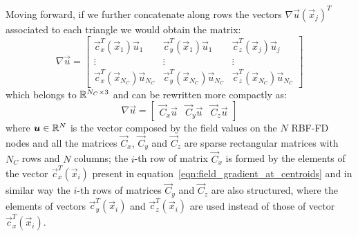 Moving forward, if we further concatenate along rows the vectors $\nabla \vec{u}(\vec{x}_j)^T$ associated to each triangle we would obtain the matrix:
\begin{equation}
	\label{eqn:field_gradient_at_centroids}
		\nabla \vec{u} =
			\begin{bmatrix}
				\vec{c}_x^T(\vec{x}_1) \vec{u}_1  			  &  \vec{c}_y^T(\vec{x}_1) \vec{u}_1  		   &  \vec{c}_z^T(\vec{x}_j) \vec{u}_j  							\\
				\vdots									  & \vdots					   		 		   & \vdots															\\
				\vec{c}_x^T(\vec{x}_{N_C}) \vec{u}_{N_C}  &  \vec{c}_y^T(\vec{x}_{N_C}) \vec{u}_{N_C}  &  \vec{c}_z^T(\vec{x}_{N_C}) \vec{u}_{N_C}
			\end{bmatrix}
\end{equation}
which belongs to $\mathbb{R}^{N_C \times 3}$ and can be rewritten more compactly as:
\begin{equation}
	\nabla \vec{u} =
	\begin{bmatrix}
		\vec{C}_x \vec{u}  &  \vec{C}_y \vec{u}  &  \vec{C}_z \vec{u}
	\end{bmatrix}
\end{equation}
where $\boldsymbol{u} \in \mathbb{R}^{N}$ is the vector composed by the field values on the $N$ RBF-FD nodes and all the matrices $\vec{C}_x$, $\vec{C}_y$ and $\vec{C}_z$ are sparse rectangular matrices with $N_C$ rows and $N$ columns; the $i$-th row of matrix $\vec{C}_x$ is formed by the elements of the vector $\vec{c}_x^T(\vec{x}_i)$ present in equation~\eqref{eqn:field_gradient_at_centroids} and in similar way the $i$-th rows of matrices $\vec{C}_y$ and $\vec{C}_z$ are also structured, where the elements of vectors $\vec{c}_y^T(\vec{x}_i)$ and $\vec{c}_z^T(\vec{x}_i)$ are used instead of those of vector $\vec{c}_x^T(\vec{x}_i)$.

